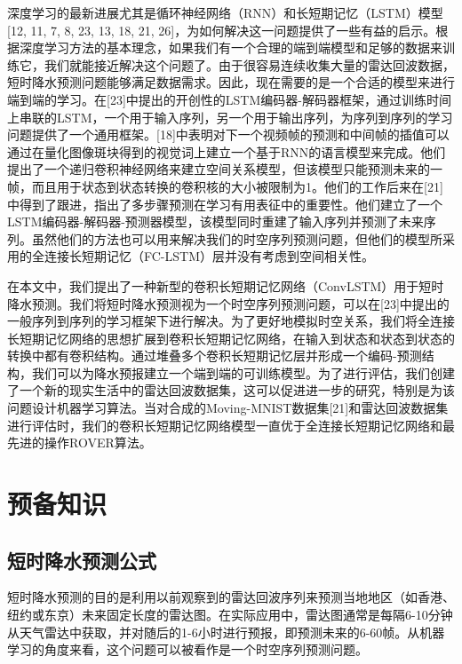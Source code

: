 \par 深度学习的最新进展尤其是循环神经网络（RNN）和长短期记忆（LSTM）模型[12, 11, 7, 8, 23, 13, 18, 21, 26]，为如何解决这一问题提供了一些有益的启示。根据深度学习方法的基本理念，如果我们有一个合理的端到端模型和足够的数据来训练它，我们就能接近解决这个问题了。由于很容易连续收集大量的雷达回波数据，短时降水预测问题能够满足数据需求。因此，现在需要的是一个合适的模型来进行端到端的学习。在[23]中提出的开创性的LSTM编码器-解码器框架，通过训练时间上串联的LSTM，一个用于输入序列，另一个用于输出序列，为序列到序列的学习问题提供了一个通用框架。[18]中表明对下一个视频帧的预测和中间帧的插值可以通过在量化图像斑块得到的视觉词上建立一个基于RNN的语言模型来完成。他们提出了一个递归卷积神经网络来建立空间关系模型，但该模型只能预测未来的一帧，而且用于状态到状态转换的卷积核的大小被限制为1。他们的工作后来在[21]中得到了跟进，指出了多步骤预测在学习有用表征中的重要性。他们建立了一个LSTM编码器-解码器-预测器模型，该模型同时重建了输入序列并预测了未来序列。虽然他们的方法也可以用来解决我们的时空序列预测问题，但他们的模型所采用的全连接长短期记忆（FC-LSTM）层并没有考虑到空间相关性。

\par 在本文中，我们提出了一种新型的卷积长短期记忆网络（ConvLSTM）用于短时降水预测。我们将短时降水预测视为一个时空序列预测问题，可以在[23]中提出的一般序列到序列的学习框架下进行解决。为了更好地模拟时空关系，我们将全连接长短期记忆网络的思想扩展到卷积长短期记忆网络，在输入到状态和状态到状态的转换中都有卷积结构。通过堆叠多个卷积长短期记忆层并形成一个编码-预测结构，我们可以为降水预报建立一个端到端的可训练模型。为了进行评估，我们创建了一个新的现实生活中的雷达回波数据集，这可以促进进一步的研究，特别是为该问题设计机器学习算法。当对合成的Moving-MNIST数据集[21]和雷达回波数据集进行评估时，我们的卷积长短期记忆网络模型一直优于全连接长短期记忆网络和最先进的操作ROVER算法。

\section{预备知识}
\subsection{短时降水预测公式}
\par 短时降水预测的目的是利用以前观察到的雷达回波序列来预测当地地区（如香港、纽约或东京）未来固定长度的雷达图。在实际应用中，雷达图通常是每隔6-10分钟从天气雷达中获取，并对随后的1-6小时进行预报，即预测未来的6-60帧。从机器学习的角度来看，这个问题可以被看作是一个时空序列预测问题。

